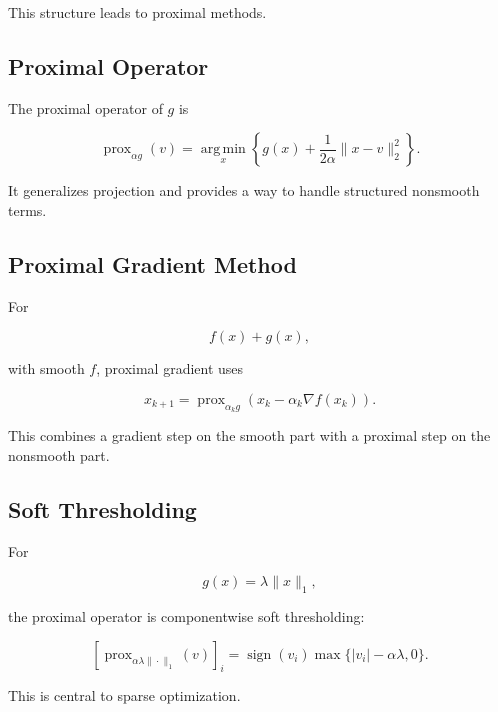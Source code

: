This structure leads to proximal methods.

\subsection{Proximal Operator}
\label{subsec:proximal-operator-numerical}

The proximal operator of \(g\) is

\[
\boxed{
\operatorname{prox}_{\alpha g}(v)
=
\operatorname*{arg\,min}_x
\left\{
g(x)
+
\frac1{2\alpha}
\|x-v\|_2^2
\right\}.
}
\]

It generalizes projection and provides a way to handle structured
nonsmooth terms.

\subsection{Proximal Gradient Method}
\label{subsec:proximal-gradient-method}

For

\[
f(x)+g(x),
\]

with smooth \(f\), proximal gradient uses

\[
\boxed{
x_{k+1}
=
\operatorname{prox}_{\alpha_kg}
\left(
x_k
-
\alpha_k
\nabla f(x_k)
\right).
}
\]

This combines a gradient step on the smooth part with a proximal step on
the nonsmooth part.

\subsection{Soft Thresholding}
\label{subsec:soft-thresholding-numerical}

For

\[
g(x)
=
\lambda\|x\|_1,
\]

the proximal operator is componentwise soft thresholding:

\[
\boxed{
[\operatorname{prox}_{\alpha\lambda\|\cdot\|_1}(v)]_i
=
\operatorname{sign}(v_i)
\max
\{
|v_i|-\alpha\lambda,
0
\}.
}
\]

This is central to sparse optimization.

